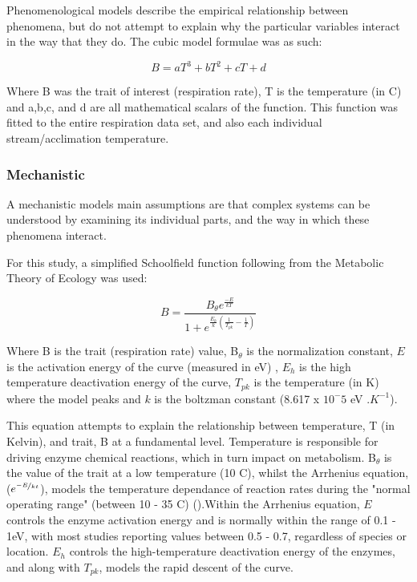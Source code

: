 \documentclass[../../Paper.tex]{subfiles}
\begin{document}
Phenomenological models describe the empirical relationship between phenomena,
but do not attempt to explain why the particular variables interact in the way
that they do. The cubic model formulae was as such:

\begin{equation}
B = aT^3 + bT^2 + cT + d
\end{equation}

Where B was the trait of interest (respiration rate), T is the temperature (in 
\degree C) and a,b,c, and d are all mathematical scalars of the function. This 
function was fitted to the entire respiration data set, and also each individual
stream/acclimation temperature.

\subsubsection*{Mechanistic}

A mechanistic models main assumptions are that complex systems can be understood 
by examining its individual parts, and the way in which these phenomena 
interact. 

For this study, a simplified Schoolfield function following from the Metabolic 
Theory of Ecology was used:

\begin{equation}
B = \frac{B_{\theta} e^{\frac{-E}{kT}}}{1 + e^{\frac{E_h}{k} (\frac{1}{T_{pk}} - \frac{1}{T})}}
\end{equation}

Where B is the trait (respiration rate) value, B$_\theta$ is the normalization 
constant, $E$ is the activation energy of the curve (measured in eV)
, $E_h$ is the high temperature deactivation energy of the curve, $T_{pk}$ is the temperature (in K) 
where the model peaks and $k$ is the boltzman constant (8.617 x $10^-5$ eV .$ 
K^{-1}$).

This equation attempts to explain the relationship between temperature, T (in 
Kelvin), and trait, B at a fundamental level. 
Temperature is responsible for driving enzyme chemical reactions, which in turn impact on 
metabolism. B$_\theta$ is the value of the trait at a low temperature 
(10 \degree C), whilst the Arrhenius equation, ($e^{\nicefrac{-E}{kt}}$),
models the temperature dependance of reaction rates during the "normal operating range"
(between 10 - 35 \degree C) (\cite{brown_toward_2004}).Within the Arrhenius equation,  $E$ controls the enzyme activation energy and 
is normally within the range of 0.1 - 1eV, with most studies reporting values between 0.5 - 
0.7, regardless of species or location. $E_h$ controls the high-temperature deactivation energy
of the enzymes, and along with $T_{pk}$, models the rapid descent of the curve. 
\end{document}
